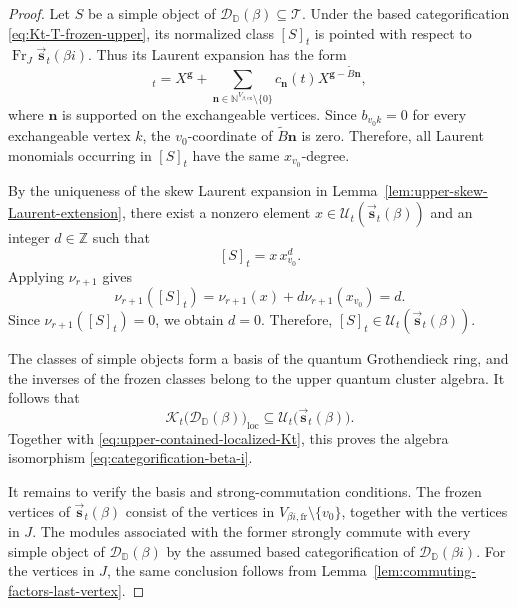 \documentclass[12pt, reqno]{amsart}
\theoremstyle{plain}
\theoremstyle{definition}
\numberwithin{equation}{section}
\newcommand{\ZZ}{\mathbb{Z}}
\newcommand{\NN}{\mathbb{N}}
\newcommand{\DD}{\mathbb{D}}
\begin{document}
\begin{proof}
Let \(S\) be a simple object of
\(\mathscr D_{\DD}(\beta)\subseteq\mathscr T\). Under the based
categorification \eqref{eq:Kt-T-frozen-upper}, its normalized class
\([S]_t\) is pointed with respect to
\(\operatorname{Fr}_{J}
\overrightarrow{\mathbf s}_t(\beta i)\). Thus its Laurent expansion
has the form
\begin{equation*}
    [S]_t
    =
    X^{\mathbf g}
    +
    \sum_{\mathbf n\in\NN^{V_{\beta,\mathrm{ex}}}\setminus\{0\}}
    c_{\mathbf n}(t)
    X^{\mathbf g-\widetilde B\mathbf n},
\end{equation*}
where \(\mathbf n\) is supported on the exchangeable vertices. Since
\(b_{v_0k}=0\) for every exchangeable vertex \(k\), the
\(v_0\)-coordinate of \(\widetilde B\mathbf n\) is zero. Therefore,
all Laurent monomials occurring in \([S]_t\) have the same
\(x_{v_0}\)-degree.

By the uniqueness of the skew Laurent expansion in
Lemma~\ref{lem:upper-skew-Laurent-extension}, there exist a nonzero
element
\(x\in\mathcal U_t(\overrightarrow{\mathbf s}_t(\beta))\)
and an integer \(d\in\ZZ\) such that
\begin{equation}\label{eq:S-skew-Laurent-homogeneous}
    [S]_t=x\,x_{v_0}^{d}.
\end{equation}
Applying \(\nu_{r+1}\) gives
\begin{equation*}\nu_{r+1}([S]_t)
=\nu_{r+1}(x)+d\nu_{r+1}(x_{v_0})=d.\end{equation*}
Since \(\nu_{r+1}([S]_t)=0\), we obtain \(d=0\). Therefore,
\([S]_t\in
\mathcal U_t(\overrightarrow{\mathbf s}_t(\beta))\).

The classes of simple objects form a basis of the quantum
Grothendieck ring, and the inverses of the frozen classes belong to
the upper quantum cluster algebra. It follows that
\begin{equation}\label{eq:Kt-D-beta-contained-upper}
    \mathcal{K}_t\bigl(
        \mathscr D_{\DD}(\beta)
    \bigr)_{\mathrm{loc}}
    \subseteq
    \mathcal U_t\bigl(
        \overrightarrow{\mathbf s}_t(\beta)
    \bigr).
\end{equation}
Together with \eqref{eq:upper-contained-localized-Kt}, this proves
the algebra isomorphism \eqref{eq:categorification-beta-i}.

It remains to verify the basis and strong-commutation conditions.
The frozen vertices of
\(\overrightarrow{\mathbf s}_t(\beta)\) consist of the vertices in
\(V_{\beta i,\mathrm{fr}}\setminus\{v_0\}\), together with the
vertices in \(J\). The modules associated with the former strongly
commute with every simple object of
\(\mathscr D_{\DD}(\beta)\) by the assumed based categorification of
\(\mathscr D_{\DD}(\beta i)\). For the
vertices in \(J\), the same conclusion follows from
Lemma~\ref{lem:commuting-factors-last-vertex}.


\end{proof}
\end{document}
